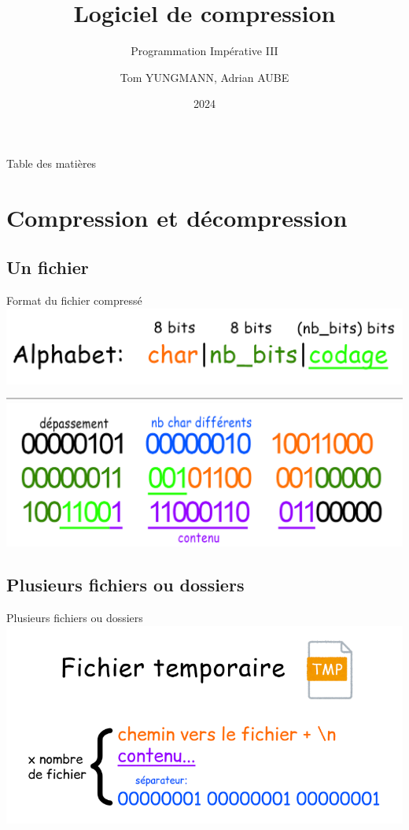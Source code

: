 \documentclass{beamer}
\title{Logiciel de compression}
\subtitle{Programmation Impérative III}
\author{Tom YUNGMANN, Adrian AUBE}
\institute{Faculté des Sciences et Techniques, Université Jean Monnet}
\date{2024}
\begin{document}
\frame{\titlepage}

\begin{frame}{Table des matières}
    \tableofcontents
\end{frame}



\section{Compression et décompression}

\subsection{Un fichier}

\begin{frame}{Format du fichier compressé}
    \includegraphics[scale=0.3]{latex_alphabet.png}
    \includegraphics[scale=0.24]{latex_separator.png} 
    \includegraphics[scale=0.24]{latex_1seulfichier.png} 
\end{frame}

\subsection{Plusieurs fichiers ou dossiers}

\begin{frame}{Plusieurs fichiers ou dossiers}
    \includegraphics[scale=0.5]{latex_tmp.png}
\end{frame}
\end{document}
